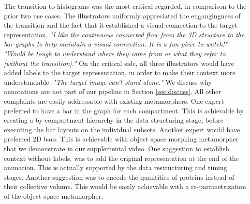 





The transition to histograms was the most critical regarded, in comparison to the prior two use cases.
The illustrators uniformly appreciated the engangingness of the transition and the fact that it established a visual connection to the target representation, \textit{"I like the continuous connected flow from the 3D structure to the bar graphs to help maintain a visual connection. It is a fun piece to watch!" "Would be tough to understand where they came from or what they refer to [without the transition]."}
On the critical side, all three illustrators would have added labels to the target representation, in order to make their context more understandable. \textit{"The target image can't stand alone."}
We discuss why annotations are not part of our pipeline in Section \ref{sec:discuss}.
All other complaints are easily addressable with existing metamorphers. One expert preferred to have a bar in the graph for each compartment. This is achievable by creating a by-compartment hierarchy in the data structuring stage, before executing the bar layouts on the individual subsets. Another expert would have preferred 2D bars. This is achievable with object space morphing metamorpher that we demonstrate in our supplemental video. One suggestion to establish context without labels, was to add the original representation at the end of the animation. This is actually supported by the data restructuring and timing stages. Another suggestion was to encode the quantities of proteins instead of their collective volume. This would be easily achievable with a re-parametrization of the object space metamorpher.

